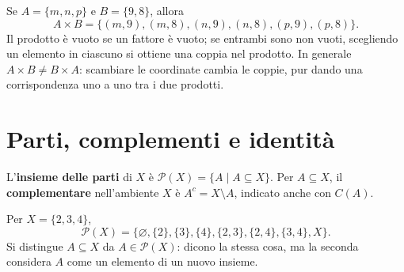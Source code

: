 \begin{esempio}
Se $A=\{m,n,p\}$ e $B=\{9,8\}$, allora
\[
A\times B=\{(m,9),(m,8),(n,9),(n,8),(p,9),(p,8)\}.
\]
Il prodotto è vuoto se un fattore è vuoto; se entrambi sono non vuoti, scegliendo un elemento in ciascuno si ottiene una coppia nel prodotto. In generale $A\times B\ne B\times A$: scambiare le coordinate cambia le coppie, pur dando una corrispondenza uno a uno tra i due prodotti.
\end{esempio}

\section{Parti, complementi e identità}
\begin{definizione}
L'\textbf{insieme delle parti} di $X$ è $\mathcal P(X)=\{A\mid A\subseteq X\}$. Per $A\subseteq X$, il \textbf{complementare} nell'ambiente $X$ è $A^c=X\setminus A$, indicato anche con $C(A)$.
\end{definizione}

\begin{esempio}
Per $X=\{2,3,4\}$,
\[
\mathcal P(X)=\{\varnothing,\{2\},\{3\},\{4\},\{2,3\},\{2,4\},\{3,4\},X\}.
\]
Si distingue $A\subseteq X$ da $A\in\mathcal P(X)$: dicono la stessa cosa, ma la seconda considera $A$ come un elemento di un nuovo insieme.
\end{esempio}

\begin{schema}
\end{schema}

